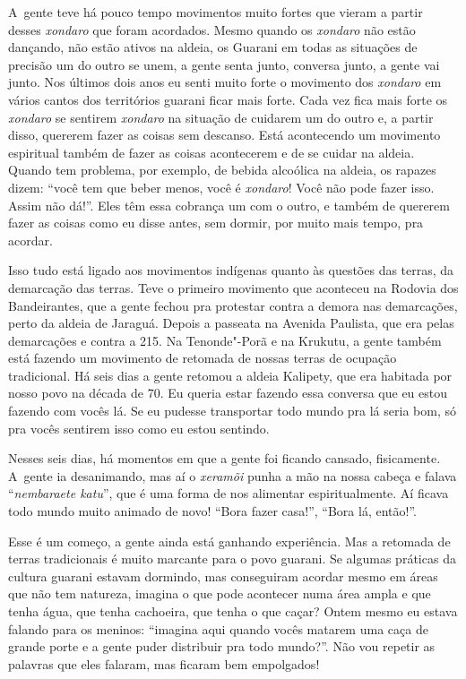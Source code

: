 A~gente teve há pouco tempo movimentos muito fortes que vieram a partir
desses \emph{xondaro} que foram acordados. Mesmo quando os \emph{xondaro} não estão
dançando, não estão ativos na aldeia, os Guarani em todas as situações
de precisão um do outro se unem, a gente senta junto, conversa junto, a
gente vai junto. Nos últimos dois anos eu senti muito forte o movimento
dos \emph{xondaro} em vários cantos dos territórios guarani ficar mais forte.
Cada vez fica mais forte os \emph{xondaro} se sentirem \emph{xondaro} na situação de
cuidarem um do outro e, a partir disso, quererem fazer as coisas sem
descanso. Está acontecendo um movimento espiritual também de fazer as
coisas acontecerem e de se cuidar na aldeia. Quando tem problema, por
exemplo, de bebida alcoólica na aldeia, os rapazes dizem: ``você tem que
beber menos, você é \emph{xondaro}! Você não pode fazer isso. Assim não dá!''.
Eles têm essa cobrança um com o outro, e também de quererem fazer as
coisas como eu disse antes, sem dormir, por muito mais tempo, pra
acordar.

Isso tudo está ligado aos movimentos indígenas quanto às questões das
terras, da demarcação das terras. Teve o primeiro movimento que
aconteceu na Rodovia dos Bandeirantes, que a gente fechou pra protestar
contra a demora nas demarcações, perto da aldeia de Jaraguá. Depois a
passeata na Avenida Paulista, que era pelas demarcações e contra a 
215. Na Tenonde"-Porã e na Krukutu, a gente também está fazendo um
movimento de retomada de nossas terras de ocupação tradicional. Há seis
dias a gente retomou a aldeia Kalipety, que era habitada por nosso povo
na década de 70. Eu queria estar fazendo essa conversa que eu estou
fazendo com vocês lá. Se eu pudesse transportar todo mundo pra lá seria
bom, só pra vocês sentirem isso como eu estou sentindo.

Nesses seis dias, há momentos em que a gente foi ficando cansado,
fisicamente. A~gente ia desanimando, mas aí o \emph{xeramõi} punha a mão na
nossa cabeça e falava ``\emph{nembaraete katu}'', que é uma forma de nos
alimentar espiritualmente. Aí ficava todo mundo muito animado de novo!
``Bora fazer casa!'', ``Bora lá, então!''. 

Esse é um começo, a gente ainda está ganhando experiência. Mas a
retomada de terras tradicionais é muito marcante para o povo guarani.
Se algumas práticas da cultura guarani estavam dormindo, mas
conseguiram acordar mesmo em áreas que não tem natureza, imagina o que
pode acontecer numa área ampla e que tenha água, que tenha cachoeira,
que tenha o que caçar? Ontem mesmo eu estava falando para os meninos:
``imagina aqui quando vocês matarem uma caça de grande porte e a gente
puder distribuir pra todo mundo?''. Não vou repetir as palavras que eles
falaram, mas ficaram bem empolgados!

